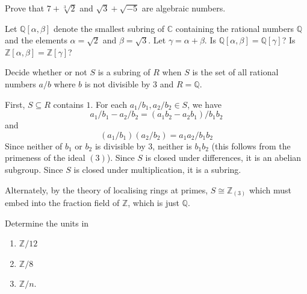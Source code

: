 \documentclass[12 pt, letterpaper]{hmcpset}
\begin{document}
\pagebreak

\begin{problem}[3.]
	Prove that $7 + \sqrt[3]{2}$ and $\sqrt{3} + \sqrt{-5}$ are algebraic numbers.
\end{problem}

\pagebreak

\begin{problem}[4.]
	Let $\mathbb{Q}[\alpha, \beta]$ denote the smallest subring of $\mathbb{C}$ containing the rational numbers $\mathbb{Q}$ and the elements $\alpha = \sqrt{2}$ and $\beta = \sqrt{3}$. Let $\gamma = \alpha + \beta$. Is $\mathbb{Q}[\alpha, \beta] = \mathbb{Q}[\gamma]$? Is $\mathbb{Z}[\alpha, \beta] = \mathbb{Z}[\gamma]$?
\end{problem}

\pagebreak

\begin{problem}[5.]
	Decide whether or not $S$ is a subring of $R$ when $S$ is the set of all rational numbers $a / b$ where $b$ is not divisible by $3$ and $R = \mathbb{Q}$.
\end{problem}

\begin{solution}
	First, $S \subseteq R$ contains $1$. For each $a_{1} / b_{1}, a_{2} / b_{2} \in S$, we have
	\[
		a_{1} / b_{1} - a_{2} / b_{2} = (a_{1} b_{2} - a_{2} b_{1}) / b_{1} b_{2}
	\]
	and
	\[
		(a_{1} / b_{1}) (a_{2} / b_{2}) = a_{1} a_{2} / b_{1} b_{2}
	\]
	Since neither of $b_{1}$ or $b_{2}$ is divisible by $3$, neither is $b_{1} b_{2}$ (this follows from the primeness of the ideal $(3)$). Since $S$ is closed under differences, it is an abelian subgroup. Since $S$ is closed under multiplication, it is a subring.

	Alternately, by the theory of localising rings at primes, $S \cong \mathbb{Z}_{(3)}$ which must embed into the fraction field of $\mathbb{Z}$, which is just $\mathbb{Q}$.
\end{solution}

\pagebreak

\begin{problem}[6.]
	Determine the units in
	\begin{enumerate}
		\item $\mathbb{Z} / 12$ 
		\item $\mathbb{Z} / 8$
		\item $\mathbb{Z} / n$.
	\end{enumerate}
\end{problem}
\end{document}
